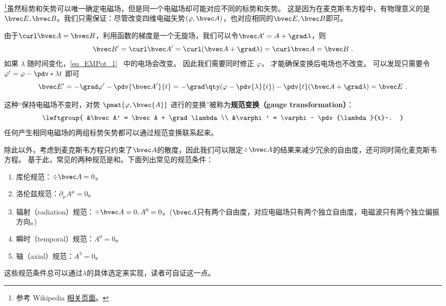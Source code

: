 
\begin{issues}
\issueDraft 
\end{issues}


\footnote{参考 Wikipedia \href{https://en.wikipedia.org/wiki/Gauge_fixing}{相关页面}。}虽然标势和矢势可以唯一确定电磁场，但是同一个电磁场却可能对应不同的标势和矢势。 这是因为在麦克斯韦方程中，有物理意义的是$\bvec E,\bvec B$。我们只需保证：尽管改变四维电磁矢势$(\varphi,\bvec A)$，也对应相同的$\bvec E,\bvec B$即可。

由于$\curl  \bvec A=\bvec B$，利用函数的梯度是一个无旋场，我们可以令$\bvec A'=A+\grad\lambda$，则
\begin{equation}
\bvec B' = \curl \bvec A' = \curl (\bvec A + \grad \lambda) = \curl \bvec A = \bvec B~.
\end{equation}
 如果 $\lambda$ 随时间变化，\autoref{eq_EMPot_1}~ 中的电场会改变。 因此我们需要同时修正 $\varphi$， 才能确保变换后电场也不改变。 可以发现只需要令 $\varphi' = \varphi - \pdv*{\lambda}{t}$ 即可
\begin{equation}
\bvec E' = -\grad \varphi' - \pdv{\bvec A'}{t} = -\grad \qty(\varphi - \pdv{\lambda}{t}) - \pdv{t} (\bvec A + \grad \lambda) = \bvec E~.
\end{equation}


这种“保持电磁场不变时，对势 $\pmat{\varphi, \bvec{A}}$ 进行的变换”被称为\textbf{规范变换（gauge transformation）}：
\begin{equation}\label{eq_Gauge_3}
\leftgroup{
&\bvec A' = \bvec A + \grad \lambda\\
&\varphi' = \varphi - \pdv{\lambda}{t}~.
}\end{equation}
任何产生相同电磁场的两组标势矢势都可以通过规范变换联系起来。

除此以外，考虑到麦克斯韦方程只约束了$\bvec A$的散度，因此我们可以限定$\div \bvec A$的结果来减少冗余的自由度，还可同时简化麦克斯韦方程。
基于此，常见的两种规范是和。下面列出常见的规范条件：
\begin{enumerate}
\item 库伦规范：$\div \bvec A=0$。
\item 洛伦兹规范：$\partial_{\mu}A^{\mu}=0$。
\item 辐射（radiation）规范：$\div \bvec A=0,A^0=0$。($\bvec A$只有两个自由度，对应电磁场只有两个独立自由度，电磁波只有两个独立偏振方向。)
\item 瞬时（temporal）规范：$A^0=0$。
\item 轴（axial）规范：$A^3=0$。
\end{enumerate}
这些规范条件总可以通过$\lambda$的具体选定来实现，读者可自证这一点。